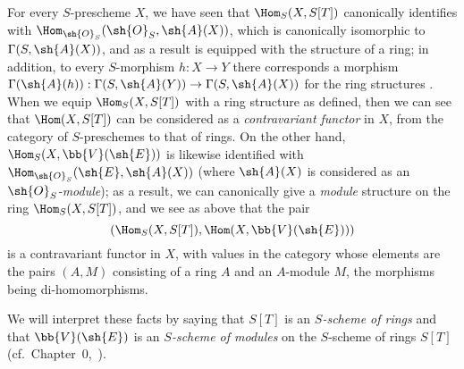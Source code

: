 \begin{env}[1.7.13]
\label{2.1.7.13}
For every $S$-prescheme $X$, we have seen  that $\Hom_S(X,S[T])$ canonically identifies with $\Hom_{\sh{O}_S}(\sh{O}_S,\sh{A}(X))$, which is canonically isomorphic to $\Gamma(S,\sh{A}(X))$, and as a result is equipped with the structure of a ring; in addition, to every $S$-morphism $h:X\to Y$ there corresponds a morphism $\Gamma(\sh{A}(h)):\Gamma(S,\sh{A}(Y))\to\Gamma(S,\sh{A}(X))$ for the ring structures .
When we equip $\Hom_S(X,S[T])$ with a ring structure as defined, then we can see that $\Hom(X,S[T])$ can be considered as a \emph{contravariant functor} in $X$, from the category of $S$-preschemes to that of rings.
On the other hand, $\Hom_S(X,\bb{V}(\sh{E}))$ is likewise identified with $\Hom_{\sh{O}_S}(\sh{E},\sh{A}(X))$ (where $\sh{A}(X)$ is considered as an \emph{$\sh{O}_S$-module}); as a result, we can canonically give a \emph{module} structure on the ring $\Hom_S(X,S[T])$, and we see as above that the pair
\[
  (\Hom_S(X,S[T]),\Hom(X,\bb{V}(\sh{E})))
\]
is a contravariant functor in $X$, with values in the category whose elements are the pairs $(A,M)$ consisting of a ring $A$ and an $A$-module $M$, the morphisms being di-homomorphisms.

We will interpret these facts by saying that $S[T]$ is an \emph{$S$-scheme of rings} and that $\bb{V}(\sh{E})$ is an \emph{$S$-scheme of modules} on the $S$-scheme of rings $S[T]$ (cf.~Chapter~0,~).
\end{env}

